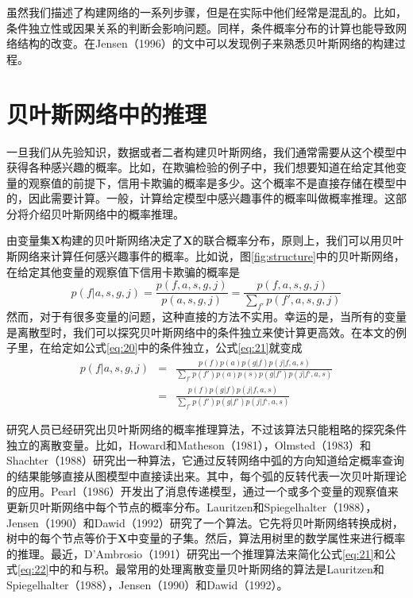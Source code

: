 \documentclass[10pt,a4paper]{article}
\begin{document}
\begin{CJK*}{UTF8}{gkai}
虽然我们描述了构建网络的一系列步骤，但是在实际中他们经常是混乱的。比如，条件独立性或因果关系的判断会影响问题。同样，条件概率分布的计算也能导致网络结构的改变。在Jensen（1996）的文中可以发现例子来熟悉贝叶斯网络的构建过程。


\section{贝叶斯网络中的推理}
一旦我们从先验知识，数据或者二者构建贝叶斯网络，我们通常需要从这个模型中获得各种感兴趣的概率。比如，在欺骗检验的例子中，我们想要知道在给定其他变量的观察值的前提下，信用卡欺骗的概率是多少。这个概率不是直接存储在模型中的，因此需要计算。一般，计算给定模型中感兴趣事件的概率叫做概率推理。这部分将介绍贝叶斯网络中的概率推理。


由变量集$\boldsymbol{X}$构建的贝叶斯网络决定了$\boldsymbol{X}$的联合概率分布，原则上，我们可以用贝叶斯网络来计算任何感兴趣事件的概率。比如说，图\ref{fig:structure}中的贝叶斯网络，在给定其他变量的观察值下信用卡欺骗的概率是
\begin{equation}
p(f|a,s,g,j)=\frac{p(f,a,s,g,j)}{p(a,s,g,j)}=\frac{p(f,a,s,g,j)}{\sum_{f'} p(f',a,s,g,j)}
\label{eq:21}
\end{equation}
然而，对于有很多变量的问题，这种直接的方法不实用。幸运的是，当所有的变量是离散型时，我们可以探究贝叶斯网络中的条件独立来使计算更高效。在本文的例子里，在给定如公式\ref{eq:20}中的条件独立，公式\ref{eq:21}就变成
\begin{eqnarray}
p(f|a,s,g,j)&=&\frac{p(f)p(a)p(g|f)p(j|f,a,s)}{\sum_{f'} p(f')p(a)p(s)p(g|f')p(j|f‘,a,s)} \\
&=&\frac{p(f)p(g|f)p(j|f,a,s)}{\sum_{f'} p(f')p(g|f')p(j|f‘,a,s)} \nonumber 
\end{eqnarray}


研究人员已经研究出贝叶斯网络的概率推理算法，不过该算法只能粗略的探究条件独立的离散变量。比如，Howard和Matheson（1981），Olmsted（1983）和Shachter（1988）研究出一种算法，它通过反转网络中弧的方向知道给定概率查询的结果能够直接从图模型中直接读出来。其中，每个弧的反转代表一次贝叶斯理论的应用。Pearl（1986）开发出了消息传递模型，通过一个或多个变量的观察值来更新贝叶斯网络中每个节点的概率分布。Lauritzen和Spiegelhalter（1988），Jensen（1990）和Dawid（1992）研究了一个算法。它先将贝叶斯网络转换成树，树中的每个节点等价于$\boldsymbol{X}$中变量的子集。然后，算法用树里的数学属性来进行概率的推理。最近，D’Ambrosio（1991）研究出一个推理算法来简化公式\ref{eq:21}和公式\ref{eq:22}中的和与积。最常用的处理离散变量贝叶斯网络的算法是Lauritzen和Spiegelhalter（1988），Jensen（1990）和Dawid（1992）。



\end{CJK*}
\end{document}
